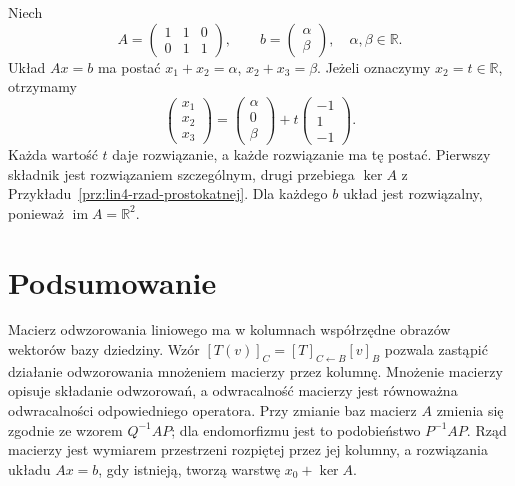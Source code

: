 \begin{przyklad}
\label{prz:lin4-rozwiazania-ukladu}
Niech
\[
 A=\begin{pmatrix}1&1&0\\0&1&1\end{pmatrix},
 \qquad b=\begin{pmatrix}\alpha\\\beta\end{pmatrix},
 \quad \alpha,\beta\in\mathbb R.
\]
Układ \(Ax=b\) ma postać
\(x_1+x_2=\alpha\), \(x_2+x_3=\beta\).
Jeżeli oznaczymy \(x_2=t\in\mathbb R\),
otrzymamy
\[
 \begin{pmatrix}x_1\\x_2\\x_3\end{pmatrix}
 =\begin{pmatrix}\alpha\\0\\\beta\end{pmatrix}
 +t\begin{pmatrix}-1\\1\\-1\end{pmatrix}.
\]
Każda wartość \(t\) daje rozwiązanie,
a każde rozwiązanie ma tę postać.
Pierwszy składnik jest rozwiązaniem
szczególnym, drugi przebiega \(\ker A\)
z Przykładu~\ref{prz:lin4-rzad-prostokatnej}.
Dla każdego \(b\) układ jest rozwiązalny,
ponieważ \(\operatorname{im}A=\mathbb R^2\).
\end{przyklad}

\section{Podsumowanie}
\label{sec:lin4-podsumowanie}

Macierz odwzorowania liniowego ma w kolumnach
współrzędne obrazów wektorów bazy dziedziny.
Wzór \([T(v)]_C=[T]_{C\leftarrow B}[v]_B\)
pozwala zastąpić działanie odwzorowania
mnożeniem macierzy przez kolumnę.
Mnożenie macierzy opisuje składanie odwzorowań,
a odwracalność macierzy jest równoważna
odwracalności odpowiedniego operatora.
Przy zmianie baz macierz \(A\) zmienia się
zgodnie ze wzorem \(Q^{-1}AP\);
dla endomorfizmu jest to podobieństwo
\(P^{-1}AP\).
Rząd macierzy jest wymiarem przestrzeni
rozpiętej przez jej kolumny, a rozwiązania
układu \(Ax=b\), gdy istnieją, tworzą warstwę
\(x_0+\ker A\).
